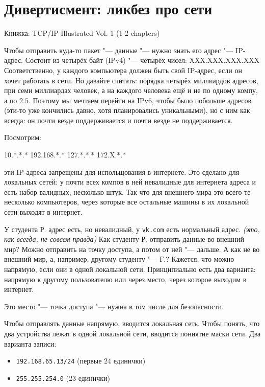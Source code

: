 \chapter{Дивертисмент: ликбез про сети}
Книжка: TCP/IP Illustrated Vol. 1 (1-2 chapters)

Чтобы отправить куда-то пакет "--- данные "--- нужно знать его адрес "--- IP-адрес. 
Состоит из четырёх байт (IPv4) "--- четырёх чисел: XXX.XXX.XXX.XXX
Соответственно, у каждого компьютера должен быть свой IP-адрес, если он хочет работать в сети.
Но давайте считать: 
порядка четырёх миллиардов адресов, 
при семи миллиардах человек, 
а на каждого человека ещё и не по одному компу, а по $2.5$.
Поэтому мы мечтаем перейти на IPv6, чтобы было побольше адресов 
(эти-то уже кончились давно, хотя планировались уникальными), 
но с ним как всегда: он почти везде поддерживается и почти везде не поддерживается.

Посмотрим:
\begin{javacode}
10.*.*.*
192.168.*.*
127.*.*.*
172.X.*.*
\end{javacode}
эти IP-адреса запрещены для испольщования в интернете.
Это сделано для локальных сетей: у почти всех компов в ней невалидные для интернета адреса и есть набор валидных, несколько штук.
Так что для внешнего мира это всего те несколько компьютеров, 
через которые все остальные машины в их локальной сети выходят в интернет.


\begin{exmp}
У студента Р. адрес есть, но невалидный, у \texttt{vk.com} есть нормальный адрес.
\textit{(это, как всегда, не совсем правда)}
Как студенту Р. отправить данные во внешний мир?
Можно отправить на точку доступа, а потом от ней "--- дальше.
А как не во внешний мир, а, например, другому студенту "--- Г.?
Кажется, что можно напрямую, если они в одной локальной сети.
Принципиально есть два варианта: напрямую к другому пользователю или через место, через которое выходим в интернет.

Это место "--- точка доступа "--- нужна в том числе для безопасности.
\end{exmp}
Чтобы отправлять данные напрямую, вводится локальная сеть. 
Чтобы понять, что два устройства лежат в одной локальной сети, вводится пониятие маски сети.
Два варианта записи:
\begin{itemize}
\item
\texttt{192.168.65.13/24} (первые $24$ единички)
\item
\texttt{255.255.254.0} ($23$ единички)
\end{itemize}

